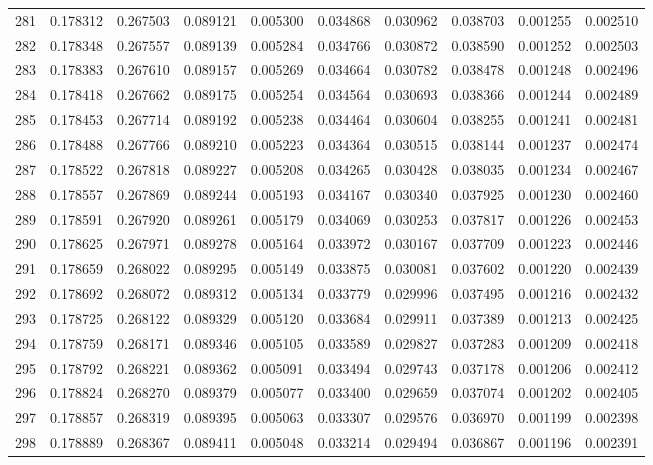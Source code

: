 \begin{tabular}{lrrrrrrrrr}
281 & 0.178312 & 0.267503 & 0.089121 & 0.005300 & 0.034868 & 0.030962 & 0.038703 & 0.001255 & 0.002510 \\
282 & 0.178348 & 0.267557 & 0.089139 & 0.005284 & 0.034766 & 0.030872 & 0.038590 & 0.001252 & 0.002503 \\
283 & 0.178383 & 0.267610 & 0.089157 & 0.005269 & 0.034664 & 0.030782 & 0.038478 & 0.001248 & 0.002496 \\
284 & 0.178418 & 0.267662 & 0.089175 & 0.005254 & 0.034564 & 0.030693 & 0.038366 & 0.001244 & 0.002489 \\
285 & 0.178453 & 0.267714 & 0.089192 & 0.005238 & 0.034464 & 0.030604 & 0.038255 & 0.001241 & 0.002481 \\
286 & 0.178488 & 0.267766 & 0.089210 & 0.005223 & 0.034364 & 0.030515 & 0.038144 & 0.001237 & 0.002474 \\
287 & 0.178522 & 0.267818 & 0.089227 & 0.005208 & 0.034265 & 0.030428 & 0.038035 & 0.001234 & 0.002467 \\
288 & 0.178557 & 0.267869 & 0.089244 & 0.005193 & 0.034167 & 0.030340 & 0.037925 & 0.001230 & 0.002460 \\
289 & 0.178591 & 0.267920 & 0.089261 & 0.005179 & 0.034069 & 0.030253 & 0.037817 & 0.001226 & 0.002453 \\
290 & 0.178625 & 0.267971 & 0.089278 & 0.005164 & 0.033972 & 0.030167 & 0.037709 & 0.001223 & 0.002446 \\
291 & 0.178659 & 0.268022 & 0.089295 & 0.005149 & 0.033875 & 0.030081 & 0.037602 & 0.001220 & 0.002439 \\
292 & 0.178692 & 0.268072 & 0.089312 & 0.005134 & 0.033779 & 0.029996 & 0.037495 & 0.001216 & 0.002432 \\
293 & 0.178725 & 0.268122 & 0.089329 & 0.005120 & 0.033684 & 0.029911 & 0.037389 & 0.001213 & 0.002425 \\
294 & 0.178759 & 0.268171 & 0.089346 & 0.005105 & 0.033589 & 0.029827 & 0.037283 & 0.001209 & 0.002418 \\
295 & 0.178792 & 0.268221 & 0.089362 & 0.005091 & 0.033494 & 0.029743 & 0.037178 & 0.001206 & 0.002412 \\
296 & 0.178824 & 0.268270 & 0.089379 & 0.005077 & 0.033400 & 0.029659 & 0.037074 & 0.001202 & 0.002405 \\
297 & 0.178857 & 0.268319 & 0.089395 & 0.005063 & 0.033307 & 0.029576 & 0.036970 & 0.001199 & 0.002398 \\
298 & 0.178889 & 0.268367 & 0.089411 & 0.005048 & 0.033214 & 0.029494 & 0.036867 & 0.001196 & 0.002391 \\

\end{tabular}
